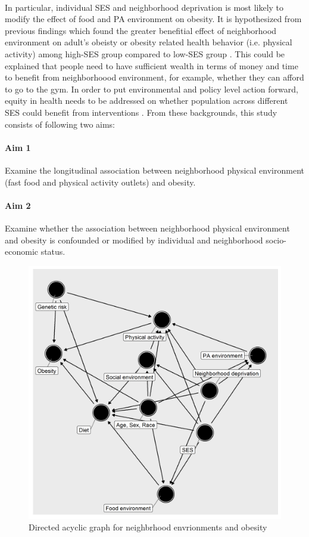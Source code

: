 \documentclass[12]{article}
\begin{document}
\paragraph{}
In particular, individual SES and neighborhood deprivation is most likely to modify the effect of food and PA environment on obesity. It is hypothesized from previous findings which found the greater benefitial effect of neighborhood environment on adult's obeisty or obesity related health behavior (i.e. physical activity) among high-SES group compared to low-SES group \cite{mason2018associations,owen2007neighborhood}. This could be explained that people need to have sufficient wealth in terms of money and time to benefit from neighborhoood environment, for example, whether they can afford to go to the gym. In order to put environmental and policy level action forward, equity in health needs to be addressed on whether population across different SES could benefit from interventions \cite{gortmaker2011changing}. From these backgrounds, this study consists of following two aims:


\paragraph{Aim 1}
Examine the longitudinal association between neighborhood physical environment (fast food and physical activity outlets) and obesity.
\paragraph{Aim 2}
Examine whether the association between neighborhood physical environment and obesity is confounded or modified by individual and neighborhood socio-economic status.

\begin{figure}[h!]
\centering
\includegraphics[width=\linewidth]{graph/dag1.png}
\caption{Directed acyclic graph for neighbrhood envrionments and obesity}
\label{fig:dag}
\end{figure}
\end{document}
